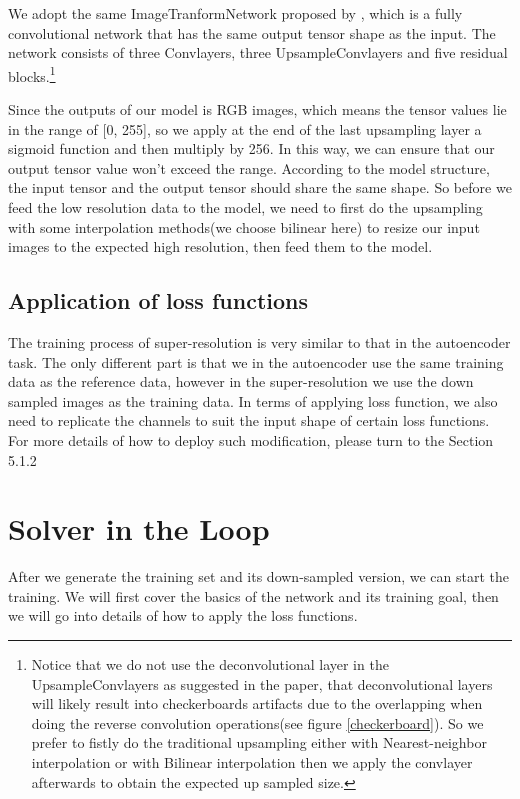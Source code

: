 \documentclass[a4paper,12pt,twoside]{report}
\begin{document}
We adopt the same ImageTranformNetwork proposed by \citeauthor{johnson2016perceptual}, which is a fully convolutional network that has the same output tensor shape as the input. The network consists of three Convlayers, three UpsampleConvlayers and five residual blocks.\footnote{Notice that we do not use the deconvolutional layer in the UpsampleConvlayers as suggested in the paper\cite{odena2016deconvolution}, that deconvolutional layers will likely result into checkerboards artifacts due to the overlapping when doing the reverse convolution operations(see figure \ref{checkerboard}). So we prefer to fistly do the traditional upsampling either with Nearest-neighbor interpolation or with Bilinear interpolation then we apply the convlayer afterwards to obtain the expected up sampled size.}

Since the outputs of our model is RGB images, which means the tensor values lie in the range of [0, 255], so we apply at the end of the last upsampling layer a sigmoid function and then multiply by 256. In this way, we can ensure that our output tensor value won't exceed the range. According to the model structure, the input tensor and the output tensor should share the same shape. So before we feed the low resolution data to the model, we need to first do the upsampling with some interpolation methods(we choose bilinear here) to resize our input images to the expected high resolution, then feed them to the model. 

\subsection{Application of loss functions}
The training process of super-resolution is very similar to that in the autoencoder task. The only different part is that we in the autoencoder use the same training data as the reference data, however in the super-resolution we use the down sampled images as the training data. In terms of applying loss function, we also need to replicate the channels to suit the input shape of certain loss functions. For more details of how to deploy such modification, please turn to the Section 5.1.2


\section{Solver in the Loop}
After we generate the training set and its down-sampled version, we can start the training. We will first cover the basics of the network and its training goal, then we will go into details of how to apply the loss functions.
\end{document}
